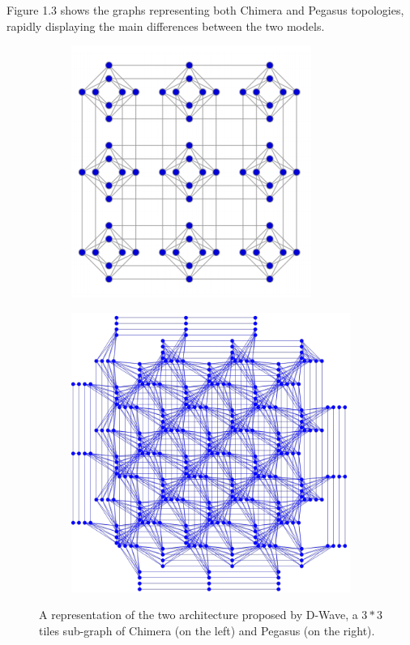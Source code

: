 Figure 1.3 shows the graphs representing both Chimera and Pegasus topologies, rapidly displaying the main differences between the two models. 
\begin{figure}[t]
    \begin{subfigure}{.5\textwidth}
        \centering
	    \includegraphics{images/QATile.PNG}
    \end{subfigure}
    \begin{subfigure}{.5\textwidth}
        \begin{center}
	    \includegraphics[width=\textwidth]{images/Pegas.PNG}
	    \end{center}
	\end{subfigure}
	\caption{A representation of the two architecture proposed by D-Wave, a $3*3$ tiles sub-graph of Chimera (on the left) and Pegasus (on the right).}
\end{figure}

\pagebreak

